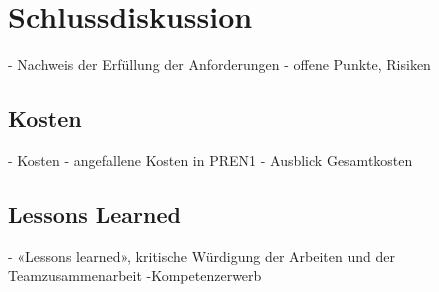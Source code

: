 \section{Schlussdiskussion}

- Nachweis der Erfüllung der Anforderungen
- offene Punkte, Risiken

\subsection{Kosten}\label{kosten}
- Kosten
- angefallene Kosten in PREN1
- Ausblick Gesamtkosten

\subsection{Lessons Learned}
- «Lessons learned», kritische Würdigung der Arbeiten und der Teamzusammenarbeit
-Kompetenzerwerb